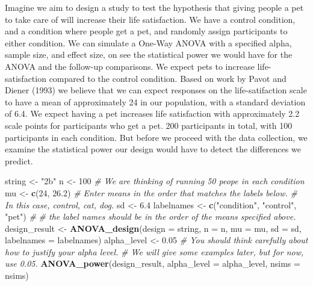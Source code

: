 \documentclass[]{book}
\newenvironment{Shaded}{\begin{snugshade}}{\end{snugshade}}
\newcommand{\CommentTok}[1]{\textcolor[rgb]{0.56,0.35,0.01}{\textit{#1}}}
\newcommand{\DataTypeTok}[1]{\textcolor[rgb]{0.13,0.29,0.53}{#1}}
\newcommand{\DecValTok}[1]{\textcolor[rgb]{0.00,0.00,0.81}{#1}}
\newcommand{\FloatTok}[1]{\textcolor[rgb]{0.00,0.00,0.81}{#1}}
\newcommand{\KeywordTok}[1]{\textcolor[rgb]{0.13,0.29,0.53}{\textbf{#1}}}
\newcommand{\NormalTok}[1]{#1}
\newcommand{\StringTok}[1]{\textcolor[rgb]{0.31,0.60,0.02}{#1}}
\begin{document}
Imagine we aim to design a study to test the hypothesis that giving people a pet to take care of will increase their life satisfaction. We have a control condition, and a condition where people get a pet, and randomly assign participants to either condition. We can simulate a One-Way ANOVA with a specified alpha, sample size, and effect size, on see the statistical power we would have for the ANOVA and the follow-up comparisons. We expect pets to increase life-satisfaction compared to the control condition. Based on work by Pavot and Diener (1993) we believe that we can expect responses on the life-satifaction scale to have a mean of approximately 24 in our population, with a standard deviation of 6.4. We expect having a pet increases life satisfaction with approximately 2.2 scale points for participants who get a pet. 200 participants in total, with 100 participants in each condition. But before we proceed with the data collection, we examine the statistical power our design would have to detect the differences we predict.

\begin{Shaded}
\begin{Highlighting}[]
\NormalTok{string <-}\StringTok{ "2b"}
\NormalTok{n <-}\StringTok{ }\DecValTok{100}
\CommentTok{# We are thinking of running 50 peope in each condition}
\NormalTok{mu <-}\StringTok{ }\KeywordTok{c}\NormalTok{(}\DecValTok{24}\NormalTok{, }\FloatTok{26.2}\NormalTok{)}
\CommentTok{# Enter means in the order that matches the labels below.}
\CommentTok{# In this case, control, cat, dog. }
\NormalTok{sd <-}\StringTok{ }\FloatTok{6.4}
\NormalTok{labelnames <-}\StringTok{ }\KeywordTok{c}\NormalTok{(}\StringTok{"condition"}\NormalTok{, }\StringTok{"control"}\NormalTok{, }\StringTok{"pet"}\NormalTok{) }\CommentTok{#}
\CommentTok{# the label names should be in the order of the means specified above.}
\NormalTok{design_result <-}\StringTok{ }\KeywordTok{ANOVA_design}\NormalTok{(}\DataTypeTok{design =}\NormalTok{ string,}
                   \DataTypeTok{n =}\NormalTok{ n, }
                   \DataTypeTok{mu =}\NormalTok{ mu, }
                   \DataTypeTok{sd =}\NormalTok{ sd, }
                   \DataTypeTok{labelnames =}\NormalTok{ labelnames)}
\NormalTok{alpha_level <-}\StringTok{ }\FloatTok{0.05}
\CommentTok{# You should think carefully about how to justify your alpha level.}
\CommentTok{# We will give some examples later, but for now, use 0.05.}
\KeywordTok{ANOVA_power}\NormalTok{(design_result, }\DataTypeTok{alpha_level =}\NormalTok{ alpha_level, }\DataTypeTok{nsims =}\NormalTok{ nsims)}
\end{Highlighting}
\end{Shaded}
\end{document}
